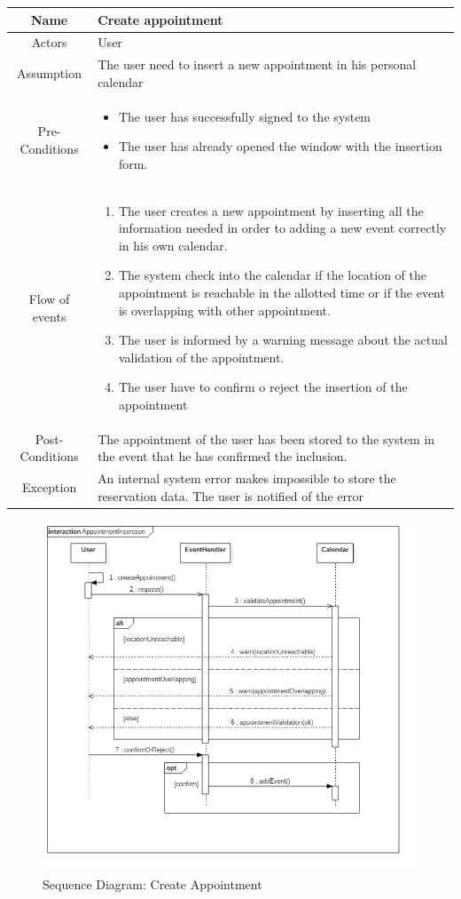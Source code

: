 \begin{center}

	\begin{tabular}{|c||p{}|}
		\hline
		Name & Create appointment \\ \hline
		Actors & User \\ \hline
		Assumption & The user need to insert a new appointment in his personal calendar \\ \hline
		Pre-Conditions & \begin{itemize}
			\item The user has successfully signed to the system
			\item The user has already opened the window with the insertion form.
		\end{itemize} \\ \hline
		Flow of events & \begin{enumerate}
			\item The user creates a new appointment by inserting all the information needed in order to adding a new event correctly in his own calendar.
			\item The system check into the calendar if the location of the appointment is reachable in the allotted time or if the event is overlapping with other appointment.
			\item The user is informed by a warning message about the actual validation of the appointment.
			\item The user have to confirm o reject the insertion of the appointment
		\end{enumerate} \\ \hline
		Post-Conditions & The appointment of the user has been stored to the system in the event that he has confirmed the inclusion. \\ \hline
		Exception & An internal system error makes impossible to store the reservation data. The user is notified of the error \\ \hline		
	\end{tabular}
\end{center}

\begin{figure}[H]
	\centering
	\includegraphics[width=6in]{./diagrams/AppointmentInserction.png}
	\caption{Sequence Diagram: Create Appointment}
	\label{fig:SequenceAddApp}
\end{figure}